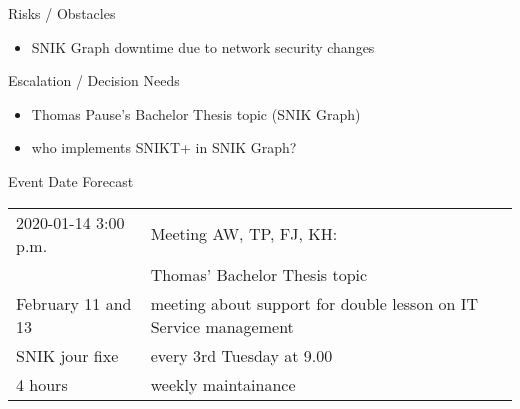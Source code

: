\documentclass[]{kiesgrube}
\begin{document}
\begin{poster}
\begin{posterbox}[name=risks,column=1,below=open]{Risks / Obstacles}
\begin{itemize}
\item SNIK Graph downtime due to network security changes 
\end{itemize}
\end{posterbox}
\begin{posterbox}[name=escalation,column=0,below=progress]{Escalation / Decision Needs}
\footnotesize
\begin{itemize}
\item Thomas Pause's Bachelor Thesis topic (SNIK Graph)
\item who implements SNIKT+ in SNIK Graph?
\end{itemize}
\end{posterbox}
\begin{posterbox}[name=event,column=1,below=risks]{Event Date Forecast}
\begin{tabulary}{\textwidth}{lL}
2020-01-14 3:00 p.m.	&Meeting AW, TP, FJ, KH:\\
			&Thomas' Bachelor Thesis topic\\

February 11 and 13&	meeting about support for double lesson on IT Service management\\
SNIK jour fixe	&every 3rd Tuesday at 9.00\\
4 hours		&weekly maintainance\\
\end{tabulary}
\end{posterbox}
\end{poster}
\end{document}
